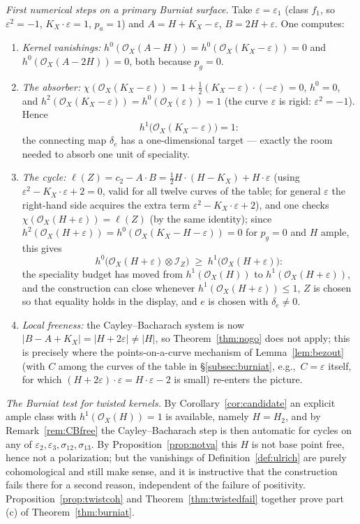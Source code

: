 \documentclass[10pt,a4paper]{amsart}
\newcommand{\OO}{\mathcal{O}}
\newcommand{\II}{\mathcal{I}}
\newcommand{\len}{\ell}
\begin{document}
\smallskip
\noindent \emph{First numerical steps on a primary Burniat surface.} Take $\varepsilon=\varepsilon_1$ (class $f_1$, so $\varepsilon^2=-1$, $K_X\cdot\varepsilon=1$, $p_a=1$) and $A=H+K_X-\varepsilon$, $B=2H+\varepsilon$. One computes:
\begin{enumerate}[label=\textup{(\alph*)}]
\item \emph{Kernel vanishings:} $h^0(\OO_X(A-H))=h^0(\OO_X(K_X-\varepsilon))=0$ and $h^0(\OO_X(A-2H))=0$, both because $p_g=0$.
\item \emph{The absorber:} $\chi(\OO_X(K_X-\varepsilon))=1+\tfrac12(K_X-\varepsilon)\cdot(-\varepsilon)=0$, $h^0=0$, and $h^2(\OO_X(K_X-\varepsilon))=h^0(\OO_X(\varepsilon))=1$ (the curve $\varepsilon$ is rigid: $\varepsilon^2=-1$). Hence
\[
h^1\bigl(\OO_X(K_X-\varepsilon)\bigr)=1 :
\]
the connecting map $\delta_e$ has a one-dimensional target --- exactly the room needed to absorb one unit of speciality.
\item \emph{The cycle:} $\len(Z)=c_2-A\cdot B=\tfrac12H\cdot(H-K_X)+H\cdot\varepsilon$ \textup{(}using $\varepsilon^2-K_X\cdot\varepsilon+2=0$, valid for all twelve curves of the table; for general $\varepsilon$ the right-hand side acquires the extra term $\varepsilon^2-K_X\cdot\varepsilon+2$\textup{)}, and one checks $\chi(\OO_X(H+\varepsilon))=\len(Z)$ \textup{(}by the same identity\textup{)}; since $h^2(\OO_X(H+\varepsilon))=h^0(\OO_X(K_X-H-\varepsilon))=0$ for $p_g=0$ and $H$ ample, this gives
\[
h^0\bigl(\OO_X(H+\varepsilon)\otimes\II_Z\bigr)\;\ge\;h^1\bigl(\OO_X(H+\varepsilon)\bigr):
\]
the speciality budget has moved from $h^1(\OO_X(H))$ to $h^1(\OO_X(H+\varepsilon))$, and the construction can close whenever $h^1(\OO_X(H+\varepsilon))\le1$, $Z$ is chosen so that equality holds in the display, and $e$ is chosen with $\delta_e\neq0$.
\item \emph{Local freeness:} the Cayley--Bacharach system is now $|B-A+K_X|=|H+2\varepsilon|\neq|H|$, so Theorem~\ref{thm:nogo} does not apply; this is precisely where the points-on-a-curve mechanism of Lemma~\ref{lem:bezout} (with $C$ among the curves of the table in \S\ref{subsec:burniat}, e.g.,\ $C=\varepsilon$ itself, for which $(H+2\varepsilon)\cdot\varepsilon=H\cdot\varepsilon-2$ is small) re-enters the picture.
\end{enumerate}
\smallskip
\noindent \emph{The Burniat test for twisted kernels.} By Corollary~\ref{cor:candidate} an explicit ample class with $h^1(\OO_X(H))=1$ is available, namely $H=H_2$, and by Remark~\ref{rem:CBfree} the Cayley--Bacharach step is then automatic for cycles on any of $\varepsilon_2,\varepsilon_3,\sigma_{12},\sigma_{13}$. By Proposition~\ref{prop:notva} this $H$ is not base point free, hence not a polarization; but the vanishings of Definition~\ref{def:ulrich} are purely cohomological and still make sense, and it is instructive that the construction fails there for a second reason, independent of the failure of positivity. Proposition~\ref{prop:twistcoh} and Theorem~\ref{thm:twistedfail} together prove part (c) of Theorem~\ref{thm:burniat}.
\end{document}
